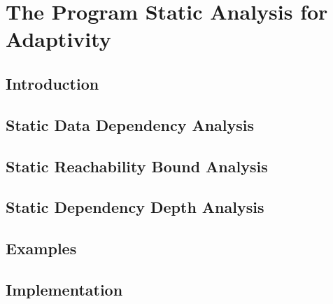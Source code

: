 \chapter{The Program Static Analysis for Adaptivity}
\label{ch:adapt-algo}


\section{Introduction}
\label{sec:static-intro}

\section{Static Data Dependency Analysis}

\section{Static Reachability Bound Analysis}

\section{Static Dependency Depth Analysis}

\section{Examples}
\label{sec:static-examples}
%
\section{Implementation}
\label{sec:static-implementation}